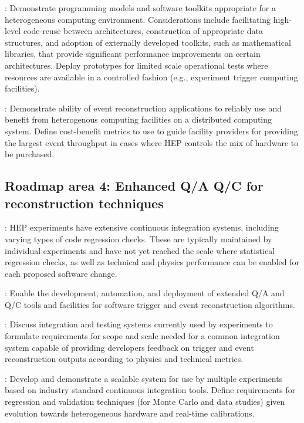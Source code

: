 \vskip 0.5cm
: Demonstrate programming models and software toolkits appropriate for a heterogeneous computing environment. Considerations include facilitating high-level 
code-reuse between architectures, construction of appropriate data structures, and adoption of externally developed toolkits, such as mathematical libraries, that provide significant performance 
improvements on certain architectures. Deploy prototypes for limited scale operational tests where resources are available in a controlled fashion (e.g., experiment trigger computing facilities).

\vskip 0.5cm
: Demonstrate ability of event reconstruction applications to reliably use and benefit from heterogenous computing facilities on a distributed computing system. 
Define cost-benefit metrics to use to guide facility providers for providing the largest event throughput in cases where HEP controls the mix of hardware to be purchased.

\subsection{Roadmap area 4: Enhanced Q/A Q/C for reconstruction techniques}
: HEP experiments have extensive continuous integration systems, including varying types of code regression checks. These are typically maintained by individual experiments 
and have not yet reached the scale where statistical regression checks, as well as technical and physics performance can be enabled for each proposed software change.

\vskip 0.5cm
: Enable the development, automation, and deployment of extended Q/A and Q/C tools and facilities for software trigger and event reconstruction algorithms. 

\vskip 0.5cm
: Discuss integration and testing systems currently used by experiments to formulate requirements for scope and scale needed for a common integration system 
capable of providing developers feedback on trigger and event reconstruction outputs according to physics and technical metrics.

\vskip 0.5cm
: Develop and demonstrate a scalable system for use by multiple experiments based on industry standard continuous integration tools. Define requirements for 
regression and validation techniques (for Monte Carlo and data studies) given evolution towards heterogeneous hardware and real-time calibrations.

